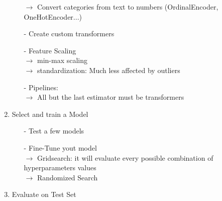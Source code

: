 \documentclass[french]{article}
\begin{document}
\begin{enumerate}
\begin{itemize}
             $\rightarrow$ Convert categories from text to numbers (OrdinalEncoder, OneHotEncoder...)
        \item[-] Create custom transformers
        \item[-] Feature Scaling \\
            $\rightarrow$ min-max scaling \\
            $\rightarrow$ standardization: Much less affected by outliers
        \item[-] Pipelines: \\
            $\rightarrow$ All but the last estimator must be transformers
    \end{itemize}
\item Select and train a Model
    \begin{itemize}
        \item[-] Test a few models
        \item[-] Fine-Tune yout model \\
            $\rightarrow$ Gridsearch: it will evaluate every possible combination of hyperparameters values \\
            $\rightarrow$ Randomized Search
    \end{itemize}
\item Evaluate on Test Set
\end{enumerate}
\end{document}
